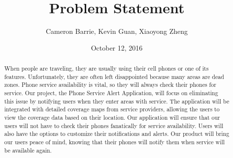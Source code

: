 \documentclass[letterpaper,10pt,draftclsnofoot,onecolumn]{IEEEtran}
\title{Problem Statement}
\date{October 12, 2016}
\author{Cameron Barrie, Kevin Guan, Xiaoyong Zheng}
\begin{document}
\maketitle
\begin{abstract}
        When people are traveling, they are usually using their cell phones or
        one of its features. Unfortunately, they are often left disappointed
        because many areas are dead zones. Phone service availability is vital,
        so they will always check their phones for service. Our project, the
        Phone Service Alert Application, will focus on eliminating this issue by
        notifying users when they enter areas with service. The application will
        be integrated with detailed coverage maps from service providers,
        allowing the users to view the coverage data based on their location.
        Our application will ensure that our users will not have to check their
        phones fanatically for service availability. Users will also have the
        options to customize their notifications and alerts. Our product will
        bring our users peace of mind, knowing that their phones will notify
        them when service will be available again.
\end{abstract}
\pagebreak

\end{document}
